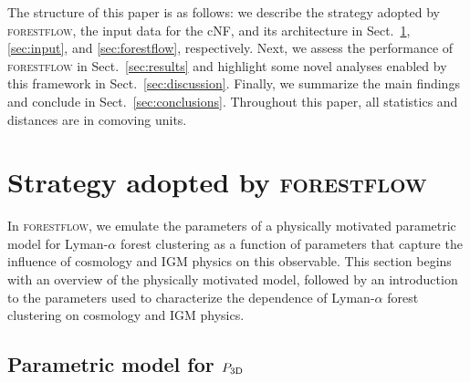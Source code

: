 \documentclass[longauth]{aa}
\newcommand{\lyaf}{Lyman-$\alpha$ forest\xspace}
\newcommand{\pthreed}{\ensuremath{P_{\rm 3D}}\xspace}
\newcommand{\forestflow}{\textsc{forestflow}\xspace}
\begin{document}
The structure of this paper is as follows: we describe the strategy adopted by \forestflow, the input data for the cNF, and its architecture in Sect.~\ref{sec:strategy}, \ref{sec:input}, and \ref{sec:forestflow}, respectively. Next, we assess the performance of \forestflow in Sect.~\ref{sec:results} and highlight some novel analyses enabled by this framework in Sect.~\ref{sec:discussion}. Finally, we summarize the main findings and conclude in Sect.~\ref{sec:conclusions}. Throughout this paper, all statistics and distances are in comoving units.


\section{Strategy adopted by \forestflow}
\label{sec:strategy}

In \forestflow, we emulate the parameters of a physically motivated parametric model for \lyaf clustering as a function of parameters that capture the influence of cosmology and IGM physics on this observable. This section begins with an overview of the physically motivated model, followed by an introduction to the parameters used to characterize the dependence of \lyaf clustering on cosmology and IGM physics.


\subsection{Parametric model for \pthreed}
\label{sec:strategy_model}
\end{document}
